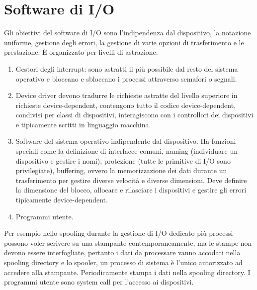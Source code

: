 \section{Software di I/O}
Gli obiettivi del software di I/O sono l'indipendenza dal dispositivo, la notazione uniforme, gestione degli errori, la gestione di varie opzioni di trasferimento e le prestazione. \`E
organizzato per livelli di astrazione: 
\begin{enumerate}
	\item Gestori degli interrupt: sono astratti il pi\`u possibile dal resto del sistema operativo e bloccano e sbloccano i processi attraverso semafori o segnali.
	\item Device driver devono tradurre le richieste astratte del livello superiore in richieste device-dependent, contengono tutto il codice device-dependent, condivisi per classi
		di dispositivi, interagiscono con i controllori dei dispositivi e tipicamente scritti in linguaggio macchina. 
	\item Software del sistema operativo indipendente dal dispositivo. Ha funzioni speciali come la definizione di interfacce comuni, naming (individuare un dispositivo e gestire i 
		nomi), protezione (tutte le primitive di I/O sono privilegiate), buffering, ovvero la memorizzazione dei dati durante un trasferimento per gestire diverse velocit\`a 
		e diverse dimensioni. Deve definire la dimensione del blocco, allocare e rilasciare i dispositivi e gestire gli errori tipicamente device-dependent. 
	\item Programmi utente. 
\end{enumerate}
Per esempio nello spooling durante la gestione di I/O dedicato pi\`u processi possono voler scrivere su una stampante contemporaneamente, ma le stampe non devono essere interfogliate, 
pertanto i dati da processare vanno accodati nella spooling directory e lo spooler, un processo di sistema \`e l'unico autorizzato ad accedere alla stampante. Periodicamente stampa i 
dati nella spooling directory. I programmi utente sono system call per l'accesso ai dispositivi. 

